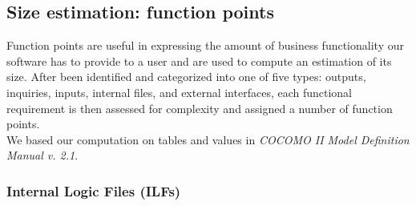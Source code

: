 \documentclass[english]{article}
\begin{document}
\begin{table}[H]
	\centering
	\caption{I'm a table.}
\end{table}

\subsection{Size estimation: function points}
Function points are useful in expressing the amount of business functionality our software has to provide to a user and are used to compute an estimation of its size.
After been identified and categorized into one of five types: outputs, inquiries, inputs, internal files, and external interfaces, each functional requirement is then assessed for complexity and assigned a number of function points.\\
We based our computation on tables and values in \emph{COCOMO II Model Definition Manual v. 2.1}.


\subsubsection{Internal Logic Files (ILFs)}
\end{document}
